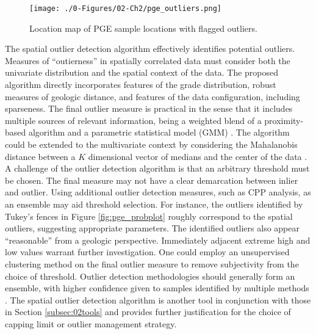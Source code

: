 \begin{figure}[htb!]
    \centering
    \texttt{[image: ./0-Figures/02-Ch2/pge\_outliers.png]}
    \caption{Location map of \gls{PGE} sample locations with flagged outliers.}
    \label{fig:pge_outliers}
\end{figure}

The spatial outlier detection algorithm effectively identifies potential outliers. Measures of ``outierness'' in spatially correlated data must consider both the univariate distribution and the spatial context of the data. The proposed algorithm directly incorporates features of the grade distribution, robust measures of geologic distance, and features of the data configuration, including sparseness. The final outlier measure is practical in the sense that it includes multiple sources of relevant information, being a weighted blend of a proximity-based algorithm and a parametric statistical model (\gls{GMM}) \citep{li2022ecod}. The algorithm could be extended to the multivariate context by considering the Mahalanobis distance between a $K$ dimensional vector of medians and the center of the data \citep{chen2008detecting}. A challenge of the outlier detection algorithm is that an arbitrary threshold must be chosen. The final measure may not have a clear demarcation between inlier and outlier. Using additional outlier detection measures, such as \gls{CPP} analysis, as an ensemble may aid threshold selection. For instance, the outliers identified by Tukey's fences in Figure \ref{fig:pge_probplot} roughly correspond to the spatial outliers, suggesting appropriate parameters. The identified outliers also appear ``reasonable'' from a geologic perspective. Immediately adjacent extreme high and low values warrant further investigation. One could employ an unsupervised clustering method on the final outlier measure to remove subjectivity from the choice of threshold. Outlier detection methodologies should generally form an ensemble, with higher confidence given to samples identified by multiple methods \citep{zimek2018there}. The spatial outlier detection algorithm is another tool in conjunction with those in Section \ref{subsec:02tools} and provides further justification for the choice of capping limit or outlier management strategy.


